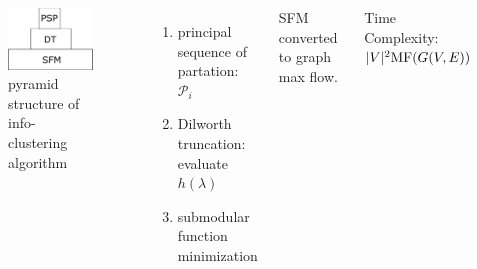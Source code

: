 \documentclass{beamer}
\DeclarePairedDelimiter\abs{\lvert}{\rvert}
\def\P{\mathcal{P}}
\begin{document}
\begin{frame}
\begin{columns}
\column{5cm}
\begin{figure}[!ht]
\centering
\includegraphics[width=5cm]{pic/pyramid.eps}
\caption{pyramid structure of info-clustering algorithm}\label{fig:ps}
\end{figure}
\column{5cm}
\begin{enumerate}
\item principal sequence of partation: $\P_i$
\item Dilworth truncation: evaluate $h(\lambda)$
\item submodular function minimization
\end{enumerate}
SFM converted to graph max flow.

Time Complexity: $\abs{V}^2 \mathrm{MF}(G(V,E))$
\end{columns}
\end{frame}
\end{document}
